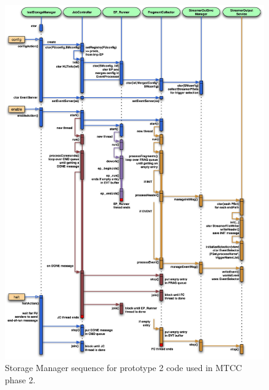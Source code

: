\begin{figure}[hbtp]
  \begin{center}
    \includegraphics[width=6.0in]{SM_base_code3_prt-2.eps}
    \caption{Storage Manager sequence for prototype 2 code used in
    MTCC phase 2.}
    \label{fig:base_SMMTCC_code}
  \end{center}
\end{figure}

